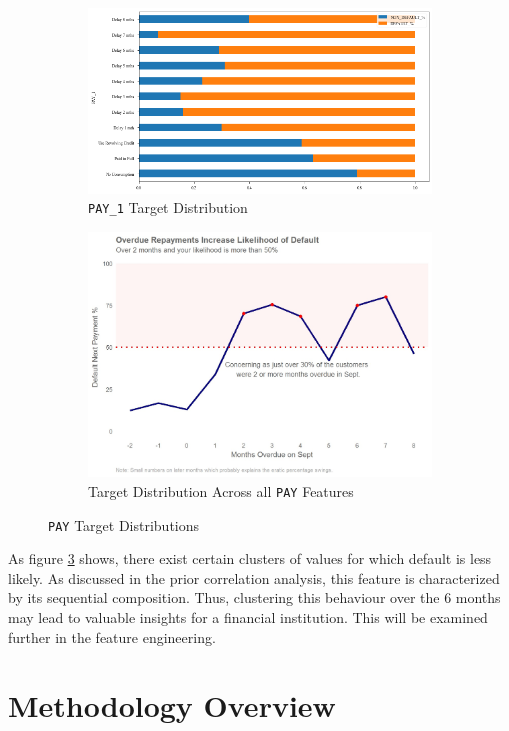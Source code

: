\documentclass{article}
\newcommand{\code}{\texttt}
\begin{document}
\begin{figure}[ht]
	\centering
	\begin{subfigure}{.5\textwidth}
		\centering
		\includegraphics[width=.8\linewidth]{pay_1_dist}
		\caption{\code{PAY\_1} Target Distribution}
		\label{fig:pay_1_dist}
	\end{subfigure}%
	\begin{subfigure}{.5\textwidth}
		\centering
		\includegraphics[width=.8\linewidth]{pay_all_dist}
		\caption{Target Distribution Across all \code{PAY} Features}
		\label{fig:pay_all_dist}
	\end{subfigure}
	\caption{\code{PAY} Target Distributions}
	\label{fig:pay_dist}
\end{figure}

As figure \ref{fig:pay_dist} shows, there exist certain clusters of values for which default is less likely. As discussed in the prior correlation analysis, this feature is characterized by its sequential composition. Thus, clustering this behaviour over the 6 months may lead to valuable insights for a financial institution. This will be examined further in the feature engineering.

\section{Methodology Overview}
\label{sec:methodology}
\end{document}
